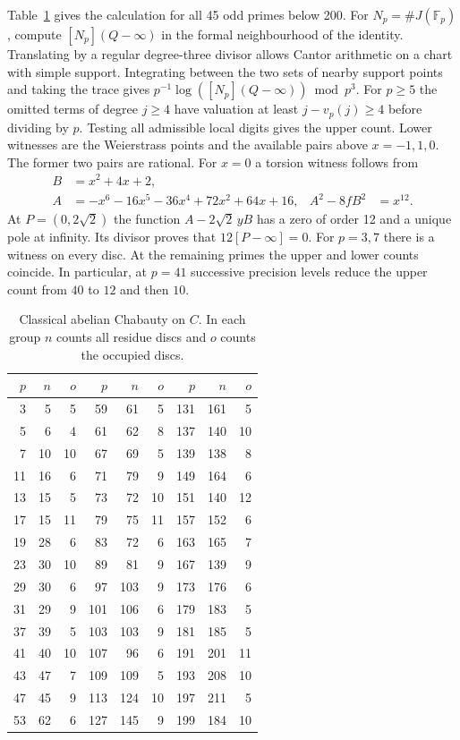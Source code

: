Table~\ref{tab:genus} gives the calculation for all 45 odd primes below
200. For \(N_p=\#J(\mathbb F_p)\), compute \([N_p](Q-\infty)\) in the
formal neighbourhood of the identity. Translating by a regular
degree-three divisor allows Cantor arithmetic on a chart with simple
support. Integrating between the two sets of nearby support points and
taking the trace gives \(p^{-1}\log([N_p](Q-\infty))\bmod p^3\).
For \(p\ge5\) the omitted terms of degree \(j\ge4\) have valuation at least
\(j-v_p(j)\ge4\) before dividing by \(p\). Testing all admissible local
digits gives the upper count. Lower witnesses are the Weierstrass
points and the available pairs above \(x=-1,1,0\). The former two
pairs are rational. For \(x=0\) a torsion witness follows from
\[
 \begin{aligned}
 B &=x^2+4x+2,\\
 A &=-x^6-16x^5-36x^4+72x^2+64x+16,&
 A^2-8fB^2&=x^{12}.
 \end{aligned}
\]
At \(P=(0,2\sqrt2)\) the function \(A-2\sqrt2\,yB\) has a zero
of order 12 and a unique pole at infinity. Its divisor proves that
\(12[P-\infty]=0\). For \(p=3,7\) there is a witness on every disc.
At the remaining primes the upper and lower counts coincide.
In particular, at \(p=41\) successive precision levels reduce the
upper count from \(40\) to \(12\) and then \(10\).
\begin{table}[htbp]
\centering
\caption{Classical abelian Chabauty on \(C\). In each group \(n\) counts
all residue discs and \(o\) counts the occupied discs.}\label{tab:genus}
\begin{tabular}{rrr@{\qquad}rrr@{\qquad}rrr}
\toprule
\(p\)&\(n\)&\(o\)&\(p\)&\(n\)&\(o\)&\(p\)&\(n\)&\(o\)\\
\midrule
3&5&5&59&61&5&131&161&5\\
5&6&4&61&62&8&137&140&10\\
7&10&10&67&69&5&139&138&8\\
11&16&6&71&79&9&149&164&6\\
13&15&5&73&72&10&151&140&12\\
17&15&11&79&75&11&157&152&6\\
19&28&6&83&72&6&163&165&7\\
23&30&10&89&81&9&167&139&9\\
29&30&6&97&103&9&173&176&6\\
31&29&9&101&106&6&179&183&5\\
37&39&5&103&103&9&181&185&5\\
41&40&10&107&96&6&191&201&11\\
43&47&7&109&109&5&193&208&10\\
47&45&9&113&124&10&197&211&5\\
53&62&6&127&145&9&199&184&10\\
\bottomrule
\end{tabular}
\end{table}

